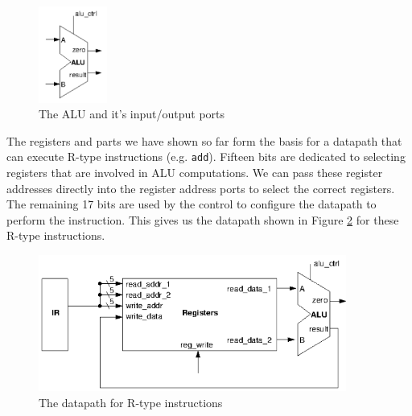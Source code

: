 \documentclass{article}
\begin{document}
	\begin{figure}[ht]
		\centering
		\includegraphics[width=0.2\textwidth]{alu}
		\caption{The ALU and it's input/output ports}
		\label{fig:alu}
	\end{figure}
	
	\par 
	The registers and parts we have shown so far form the basis for a datapath that can execute R-type instructions (e.g. \texttt{add}). Fifteen bits are dedicated to selecting registers that are involved in ALU computations. We can pass these register addresses directly into the register address ports to select the correct registers. The remaining 17 bits are used by the control to configure the datapath to perform the instruction. This gives us the datapath shown in Figure \ref{fig:r type datapath} for these R-type instructions. 

	\begin{figure}[ht]
		\centering
		\includegraphics[width = 0.9\textwidth]{r_type_datapath}
		\caption{The datapath for R-type instructions}
		\label{fig:r type datapath}
	\end{figure}
	
\end{document}
